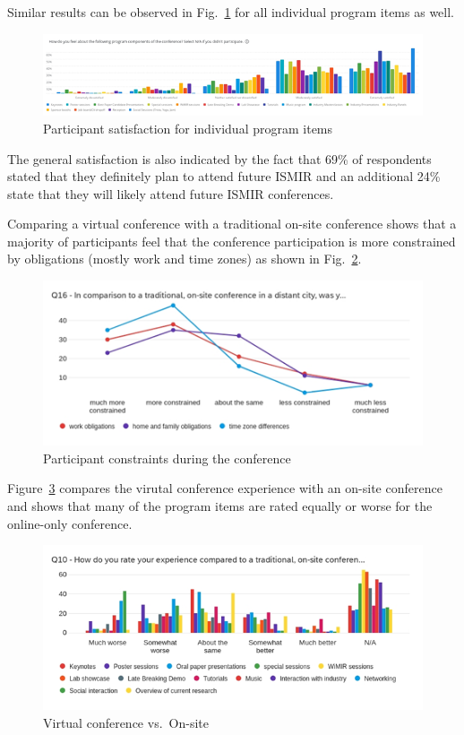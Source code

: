 \documentclass[%
10pt,								%
]
{scrartcl}
\begin{document}
        Similar results can be observed in Fig.~\ref{fig:survey_satisfaction_item} for all individual program items as well.
        \begin{figure}%
            \includegraphics[width=\columnwidth]{fig/survey_satisfaction_item}%
            \caption{Participant satisfaction for individual program items}%
            \label{fig:survey_satisfaction_item}%
        \end{figure}
        The general satisfaction is also indicated by the fact that 69\% of respondents stated that they definitely plan to attend future ISMIR and an additional 24\% state that they will likely attend future ISMIR conferences.
        
        Comparing a virtual conference with a traditional on-site conference shows that a majority of participants feel that the conference participation is more constrained by obligations (mostly work and time zones) as shown in Fig.~\ref{fig:survey_constraints}.
         \begin{figure}%
            \includegraphics[width=\columnwidth]{fig/survey_constraints}%
            \caption{Participant constraints during the conference}%
            \label{fig:survey_constraints}%
        \end{figure}
        
        Figure~\ref{fig:survey_onsite} compares the virutal conference experience with an on-site conference and shows that many of the program items are rated equally or worse for the online-only conference.
          \begin{figure}%
            \includegraphics[width=\columnwidth]{fig/survey_onsite}%
            \caption{Virtual conference vs.\ On-site}%
            \label{fig:survey_onsite}%
        \end{figure}
\end{document}
